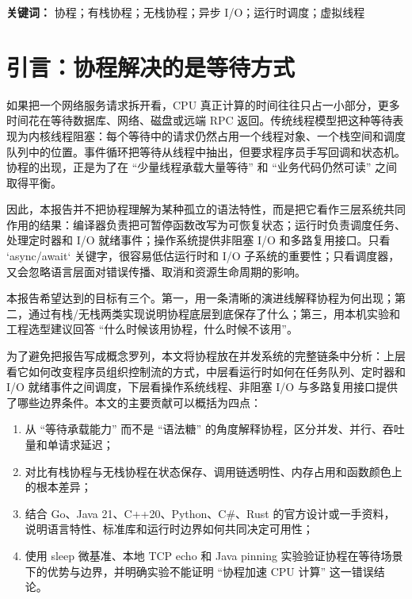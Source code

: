 \documentclass[UTF8,a4paper,12pt]{ctexart}
\begin{document}
\noindent\textbf{关键词：} 协程；有栈协程；无栈协程；异步 I/O；运行时调度；虚拟线程

\section{引言：协程解决的是等待方式}

如果把一个网络服务请求拆开看，CPU 真正计算的时间往往只占一小部分，更多时间花在等待数据库、网络、磁盘或远端 RPC 返回。传统线程模型把这种等待表现为内核线程阻塞：每个等待中的请求仍然占用一个线程对象、一个栈空间和调度队列中的位置。事件循环把等待从线程中抽出，但要求程序员手写回调和状态机。协程的出现，正是为了在 ``少量线程承载大量等待'' 和 ``业务代码仍然可读'' 之间取得平衡。

因此，本报告并不把协程理解为某种孤立的语法特性，而是把它看作三层系统共同作用的结果：编译器负责把可暂停函数改写为可恢复状态；运行时负责调度任务、处理定时器和 I/O 就绪事件；操作系统提供非阻塞 I/O 和多路复用接口。只看 `async/await` 关键字，很容易低估运行时和 I/O 子系统的重要性；只看调度器，又会忽略语言层面对错误传播、取消和资源生命周期的影响。

本报告希望达到的目标有三个。第一，用一条清晰的演进线解释协程为何出现；第二，通过有栈/无栈两类实现说明协程底层到底保存了什么；第三，用本机实验和工程选型建议回答 ``什么时候该用协程，什么时候不该用''。

为了避免把报告写成概念罗列，本文将协程放在并发系统的完整链条中分析：上层看它如何改变程序员组织控制流的方式，中层看运行时如何在任务队列、定时器和 I/O 就绪事件之间调度，下层看操作系统线程、非阻塞 I/O 与多路复用接口提供了哪些边界条件。本文的主要贡献可以概括为四点：

\begin{enumerate}
  \item 从 ``等待承载能力'' 而不是 ``语法糖'' 的角度解释协程，区分并发、并行、吞吐量和单请求延迟；
  \item 对比有栈协程与无栈协程在状态保存、调用链透明性、内存占用和函数颜色上的根本差异；
  \item 结合 Go、Java 21、C++20、Python、C\#、Rust 的官方设计或一手资料，说明语言特性、标准库和运行时边界如何共同决定可用性；
  \item 使用 sleep 微基准、本地 TCP echo 和 Java pinning 实验验证协程在等待场景下的优势与边界，并明确实验不能证明 ``协程加速 CPU 计算'' 这一错误结论。
\end{enumerate}
\end{document}

